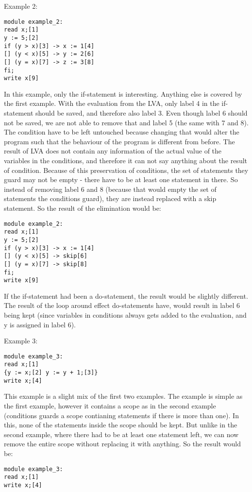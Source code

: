 \docpar
Example 2:
\begin{lstlisting}
module example_2:
read x;[1]
y := 5;[2]
if (y > x)[3] -> x := 1[4]
[] (y < x)[5] -> y := 2[6]
[] (y = x)[7] -> z := 3[8]
fi;
write x[9]
\end{lstlisting}
In this example, only the if-statement is interesting. Anything else is covered by the first example. With the evaluation from the LVA, only label 4 in the if-statement should be saved, and therefore also label 3.
Even though label 6 should not be saved, we are not able to remove that and label 5 (the same with 7 and 8). The condition have to be left untouched because changing that would alter the program such that the behaviour of the program is different from before. The result of LVA does not contain any information of the actual value of the variables in the conditions, and therefore it can not say anything about the result of condition. Because of this preservation of conditions, the set of statements they guard may not be empty - there have to be at least one statement in there. So instead of removing label 6 and 8 (because that would empty the set of statements the conditions guard), they are instead replaced with a skip statement. So the result of the elimination would be:
\begin{lstlisting}
module example_2:
read x;[1]
y := 5;[2]
if (y > x)[3] -> x := 1[4]
[] (y < x)[5] -> skip[6]
[] (y = x)[7] -> skip[8]
fi;
write x[9]
\end{lstlisting}
If the if-statement had been a do-statement, the result would be slightly different. The result of the loop around effect do-statements have, would result in label 6 being kept (since variables in conditions always gets added to the evaluation, and y is assigned in label 6).

\docpar
Example 3:
\begin{lstlisting}
module example_3:
read x;[1]
{y := x;[2] y := y + 1;[3]}
write x;[4]
\end{lstlisting}
This example is a slight mix of the first two examples. The example is simple as the first example, however it contains a scope as in the second example (conditions guards a scope contianing statements if there is more than one). In this, none of the statements inside the scope should be kept. But unlike in the second example, where there had to be at least one statement left, we can now remove the entire scope without replacing it with anything. So the result would be:
\begin{lstlisting}
module example_3:
read x;[1]
write x;[4]
\end{lstlisting}
